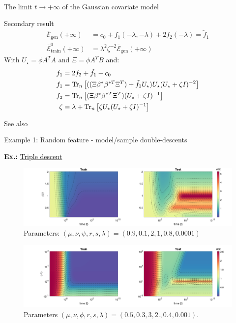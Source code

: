 \documentclass[10pt]{beamer}
\begin{document}
\begin{frame}{The limit $t\to+\infty$ of the Gaussian covariate model}
  \begin{block}{Secondary result \cite{bodin.2212.06757}}
    \begin{align*}
      \bar{\mathcal E}_{\text{gen}}(+ \infty) & = c_0 + f_1(-\lambda, -\lambda) + 2f_2(-\lambda) = \tilde f_1\\
      \bar{\mathcal E}_{\text{train}}^0 (+\infty) & = \lambda^2 \zeta^{-2} \bar{\mathcal E}_{\text{gen}}(+\infty)
    \end{align*}
    With $U_\star = \phi A^TA$ and $\Xi = \phi A^T B$ and:
    \begin{align*}
      f_1 & = 2 f_2 + \tilde f_1 - c_0\\
      f_1 & =  \traceLim[n]{ ( (\Xi \beta^* \beta^{*T} \Xi^T) + \tilde f_{1} U_\star ) U_\star (U_\star + \zeta I)^{-2}}\\
      f_2 & = \traceLim[n]{ (\Xi \beta^* \beta^{*T} \Xi^T) ( U_\star + \zeta I)^{-1}} \\
      \zeta & = \lambda + \traceLim[n]{ \zeta U_\star ( U_\star + \zeta I)^{-1}}
    \end{align*}
  \end{block}
  See also \cite{loureiro2021capturing}
\end{frame}

\begin{frame}{Example 1: Random feature - model/sample double-descents}

  \textbf{Ex.:} \href{http://127.0.0.1:8000/output.mp4}{Triple descent} \cite{dascoli2020triple, bodin2021model} 

  \vspace*{-0.2cm}
  \begin{figure}
    \centering
    \includegraphics[width=\textwidth]{images/config4_2D.white.png}
    \caption{Parameters: $(\mu,\nu,\psi,r,s,\lambda) = (0.9,0.1,2,1,0.8,0.0001)$}
  \end{figure}
  \vspace*{-0.8cm}
  \begin{figure}[h!]
    \centering
    \includegraphics[width=1.0\textwidth]{images/config2_2D.white.png}
    \caption{Parameters $(\mu,\nu,\phi,r,s,\lambda) = (0.5,0.3,3,2.,0.4,0.001)$.
    }
  \end{figure}
\end{frame}
\end{document}
